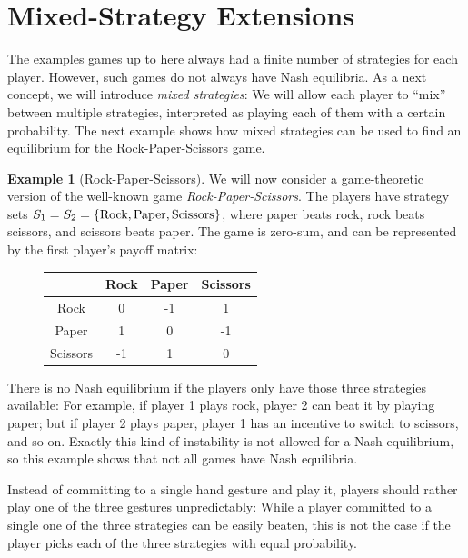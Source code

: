 \documentclass[a4paper,DIV=11]{scrreprt}
\theoremstyle{definition}
\newtheorem{ex}[thm]{Example} %
\begin{document}
    \section{Mixed-Strategy Extensions}
    The examples games up to here always had a finite number of strategies for each player.
    However, such games do not always have Nash equilibria. As a next concept, we will introduce \emph{mixed strategies}: We will allow each player to “mix” between multiple strategies, interpreted as playing each of them with a certain probability.
    The next example shows how mixed strategies can be used to find an equilibrium for the Rock-Paper-Scissors game.
    
    \begin{ex}[Rock-Paper-Scissors]
        We will now consider a game-theoretic version of the well-known game \emph{Rock-Paper-Scissors}.
        The players have strategy sets $S_1 = S_2 = \{\text{Rock}, \text{Paper}, \text{Scissors}\}$, where paper beats rock, rock beats scissors, and scissors beats paper. The game is zero-sum, and can be represented by the first player's payoff matrix:
        \begin{figure}[h]
            \centering
            \begin{tabular}{c|c|c|c|}
            	         & Rock & Paper & Scissors \\ \hline
            	  Rock   &  0   &  -1   &    1     \\ \hline
            	 Paper   &  1   &   0   &    -1    \\ \hline
            	Scissors &  -1  &   1   &    0     \\ \hline
            \end{tabular}
        \end{figure}
    
        There is no Nash equilibrium if the players only have those three strategies available: For example, if player 1 plays rock, player 2 can beat it by playing paper; but if player 2 plays paper, player 1 has an incentive to switch to scissors, and so on. Exactly this kind of instability is not allowed for a Nash equilibrium, so this example shows that not all games have Nash equilibria.
        
        Instead of committing to a single hand gesture and play it, players should rather play one of the three gestures unpredictably: While a player committed to a single one of the three strategies can be easily beaten, this is not the case if the player picks each of the three strategies with equal probability.
        \label{ex:rockPaperScissors}
    \end{ex}
\end{document}
